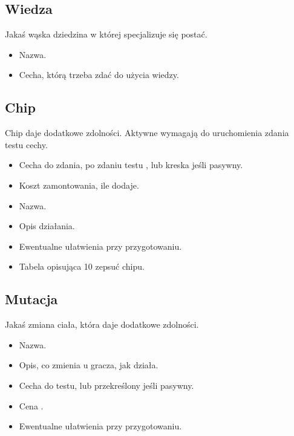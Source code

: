 \subsection{Wiedza}
Jakaś wąska dziedzina w której specjalizuje się postać.
\begin{itemize}
 \item Nazwa.
 \item Cecha, którą trzeba zdać do użycia wiedzy.
\end{itemize}

\subsection{Chip}
Chip daje dodatkowe zdolności.
Aktywne wymagają do uruchomienia zdania testu cechy.
\begin{itemize}
 \item Cecha do zdania, po zdaniu testu \abnkp{}, lub kreska jeśli pasywny.
 \item Koszt zamontowania, ile \abnkp{} dodaje.
 \item Nazwa.
 \item Opis działania.
 \item Ewentualne ułatwienia przy przygotowaniu.
 \item Tabela opisująca 10 zepsuć chipu.
\end{itemize}

\subsection{Mutacja}
Jakaś zmiana ciała, która daje dodatkowe zdolności.
\begin{itemize}
 \item Nazwa.
 \item Opis, co zmienia u gracza, jak działa.
 \item Cecha do testu, lub przekreślony jeśli pasywny.
 \item Cena \abnkp{}. 
 \item Ewentualne ułatwienia przy przygotowaniu.
\end{itemize}

